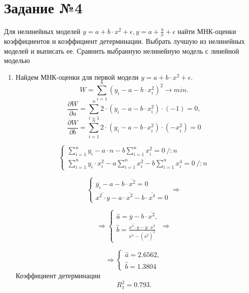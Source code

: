 \documentclass[12pt, letterpaper, twoside]{article}
\begin{document}
\section{Задание №4}
Для нелинейных моделей $y= a+b \cdot x^2 + \epsilon, y = a + \frac{b}{x} + \epsilon$ найти МНК-оценки коэффициентов и коэффициент детерминации. Выбрать лучшую из нелинейных моделей и выписать ее. Сравнить выбранную нелинейную модель с линейной моделью
\begin{enumerate}
	\item Найдем МНК-оценки для первой модели $y= a+b \cdot x^2 + \epsilon.$ 
	$$W = \sum_{i=1}^n(y_i- a - b \cdot x_i^2)^2 \rightarrow min.$$
	$$\frac{\partial W}{\partial a} = \sum_{i=1}^n 2 \cdot (y_i- a - b \cdot x_i^2) \cdot (-1) = 0,$$
	$$\frac{\partial W}{\partial b} = \sum_{i=1}^n 2 \cdot (y_i- a - b \cdot x_i^2) \cdot (-x_i^2) = 0$$
	
	\begin{equation*}
		\begin{cases}
			\sum_{i=1}^n y_i - a \cdot n - b \sum_{i=1}^n x_i^2 = 0 \ /:n \\
			\sum_{i=1}^n y_i \cdot x_i^2 - a\sum_{i=1}^n x_i^2 - b \sum_{i=1}^n x_i^4 = 0 \ /:n
		\end{cases}
	\end{equation*}

	\begin{equation*}
		\begin{cases}
			\overline{y_i} - a - b \cdot \overline{x^2} = 0 \\
			\overline{x^2 \cdot y} - a\cdot \overline{x^2} - b \cdot \overline{x^4} = 0
		\end{cases} \Rightarrow 
	\end{equation*}

	\begin{equation*}
		 \Rightarrow 
		\begin{cases}
			\hat{a} = \overline{y} - b \cdot \overline{x^2}, \\
			\hat{b} =  \frac{\overline{x^2 \cdot y} - \overline{y} \cdot \overline{x^2}}{\overline{x^4} -(\overline{x^2})^2}
		\end{cases} \Rightarrow
	\end{equation*}

	\begin{equation*}
		\Rightarrow 
		\begin{cases}
			\hat{a} =  2.6562,\\
			\hat{b} = 1.3804
		\end{cases} 
	\end{equation*}
	Коэффициент детерминации $$R_1^2 = 0.793.$$
	

\end{enumerate}
\end{document}

